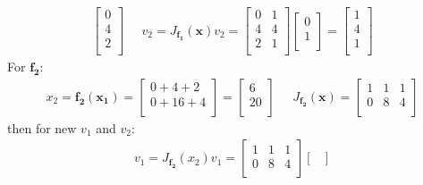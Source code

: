 \documentclass[12pt]{article}
\begin{document}
\begin{qsolve}
\begin{gather*}
\begin{bmatrix}
            0 \\
            4 \\
            2 \\
        \end{bmatrix}
        \; \; \; \; \;
        v_2 = J_{\mathbf{f_1}}(\mathbf{x}) v_2 =
        \begin{bmatrix}
            0 & 1 \\
            4 & 4 \\
            2 & 1 \\
        \end{bmatrix}
        \begin{bmatrix}
            0 \\
            1 \\
        \end{bmatrix}
        =
        \begin{bmatrix}
            1 \\
            4 \\
            1 \\
        \end{bmatrix}
    \end{gather*}
    For $\mathbf{f_2}$:
    \begin{gather*}
        x_2 = \mathbf{f_2(x_1)} = \begin{bmatrix}
            0 + 4 + 2  \\
            0 + 16 + 4 \\
        \end{bmatrix} = \begin{bmatrix}
            6  \\
            20 \\
        \end{bmatrix}
        \; \; \; \; \;
        J_{\mathbf{f_2}}(\mathbf{x}) =
        \begin{bmatrix}
            1 & 1 & 1 \\
            0 & 8 & 4 \\
        \end{bmatrix}
    \end{gather*}
    then for new $v_1$ and $v_2$:
    \begin{gather*}
        v_1 = J_{\mathbf{f_2}}(x_2) v_1 =
        \begin{bmatrix}
            1 & 1 & 1 \\
            0 & 8 & 4 \\
        \end{bmatrix}
        \begin{bmatrix}

\end{bmatrix}
\end{gather*}
\end{qsolve}
\end{document}
